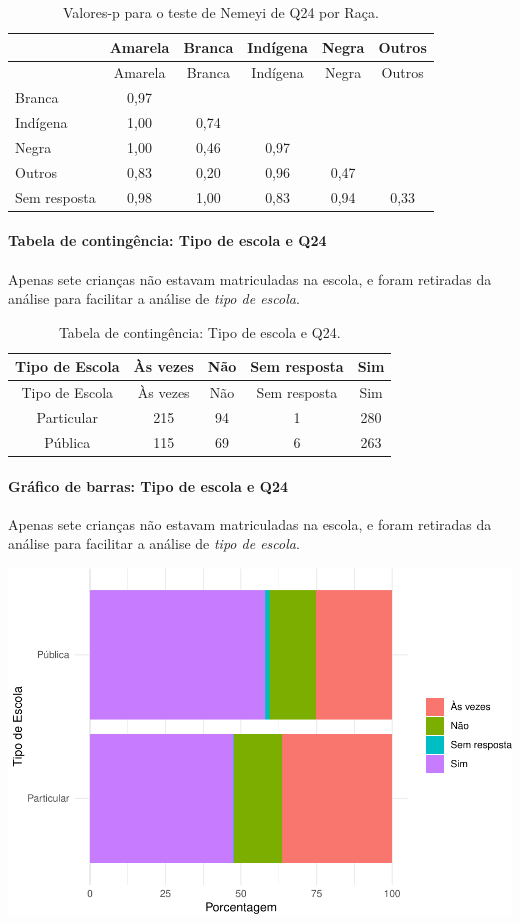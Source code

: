 \documentclass[]{article}
\let\oldparagraph\paragraph
\renewcommand{\paragraph}[1]{\oldparagraph{#1}\mbox{}}
\begin{document}
\begin{longtable}[]{@{}lccccc@{}}
\caption{\label{tab:unnamed-chunk-641}Valores-p para o teste de Nemeyi de Q24 por Raça.}\tabularnewline
\toprule
& Amarela & Branca & Indígena & Negra & Outros\tabularnewline
\midrule
\endfirsthead
\toprule
& Amarela & Branca & Indígena & Negra & Outros\tabularnewline
\midrule
\endhead
Branca & 0,97 & & & &\tabularnewline
Indígena & 1,00 & 0,74 & & &\tabularnewline
Negra & 1,00 & 0,46 & 0,97 & &\tabularnewline
Outros & 0,83 & 0,20 & 0,96 & 0,47 &\tabularnewline
Sem resposta & 0,98 & 1,00 & 0,83 & 0,94 & 0,33\tabularnewline
\bottomrule
\end{longtable}

\cleardoublepage

\hypertarget{tabela-de-continguxeancia-tipo-de-escola-e-q24}{%
\paragraph{Tabela de contingência: Tipo de escola e Q24}\label{tabela-de-continguxeancia-tipo-de-escola-e-q24}}

Apenas sete crianças não estavam matriculadas na escola, e foram retiradas da análise para facilitar a análise de \emph{tipo de escola}.

\begin{longtable}[]{@{}ccccc@{}}
\caption{\label{tab:unnamed-chunk-642}Tabela de contingência: Tipo de escola e Q24.}\tabularnewline
\toprule
Tipo de Escola & Às vezes & Não & Sem resposta & Sim\tabularnewline
\midrule
\endfirsthead
\toprule
Tipo de Escola & Às vezes & Não & Sem resposta & Sim\tabularnewline
\midrule
\endhead
Particular & 215 & 94 & 1 & 280\tabularnewline
Pública & 115 & 69 & 6 & 263\tabularnewline
\bottomrule
\end{longtable}

\hypertarget{gruxe1fico-de-barras-tipo-de-escola-e-q24}{%
\paragraph{Gráfico de barras: Tipo de escola e Q24}\label{gruxe1fico-de-barras-tipo-de-escola-e-q24}}

Apenas sete crianças não estavam matriculadas na escola, e foram retiradas da análise para facilitar a análise de \emph{tipo de escola}.

\begin{center}\includegraphics[width=0.75\linewidth]{relatorio_covid19_files/figure-latex/unnamed-chunk-643-1} \end{center}
\end{document}
